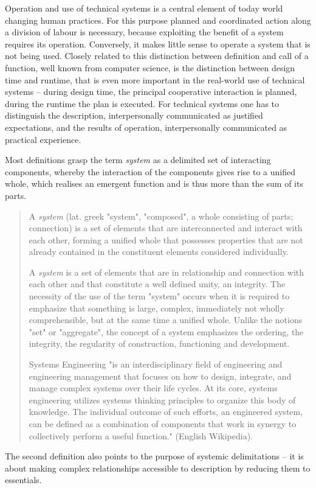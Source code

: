 \documentclass[11pt,a4paper]{article}
\begin{document}
Operation and use of technical systems is a central element of today world
changing human practices. For this purpose planned and coordinated action
along a division of labour is necessary, because exploiting the benefit of a
system requires its operation. Conversely, it makes little sense to operate a
system that is not being used. Closely related to this distinction between
definition and call of a function, well known from computer science, is the
distinction between design time and runtime, that is even more important in
the real-world use of technical systems – during design time, the principal
cooperative interaction is planned, during the runtime the plan is executed.
For technical systems one has to distinguish the description, interpersonally
communicated as justified expectations, and the results of operation,
interpersonally communicated as practical experience.

Most definitions grasp the term \emph{system} as a delimited set of
interacting components, whereby the interaction of the components gives rise
to a unified whole, which realises an emergent function and is thus more than
the sum of its parts.
\begin{quote}
  A \emph{system} (lat. greek "system", "composed", a whole consisting of
  parts; connection) is a set of elements that are interconnected and interact
  with each other, forming a unified whole that possesses properties that are
  not already contained in the constituent elements considered individually.
  \cite{Petrov2020}

  A \emph{system} is a set of elements that are in relationship and connection
  with each other and that constitute a well defined unity, an integrity. The
  necessity of the use of the term "system" occurs when it is required to
  emphasize that something is large, complex, immediately not wholly
  comprehensible, but at the same time a unified whole. Unlike the notions
  "set" or "aggregate", the concept of a system emphasizes the ordering, the
  integrity, the regularity of construction, functioning and development.
  \cite{TOP}

  Systems Engineering "is an interdisciplinary field of engineering and
  engineering management that focuses on how to design, integrate, and manage
  complex systems over their life cycles. At its core, systems engineering
  utilizes systems thinking principles to organize this body of knowledge. The
  individual outcome of such efforts, an engineered system, can be defined as
  a combination of components that work in synergy to collectively perform a
  useful function." (English Wikipedia).
\end{quote}
The second definition also points to the purpose of systemic delimitations --
it is about making complex relationships accessible to description by reducing
them to essentials.
\end{document}
